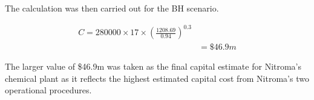 The calculation was then carried out for the BH scenario.

\begin{equation}
\begin{split} 
C=280000 \times 17 \times \left(\frac{1208.69}{0.94}\right)^{0.3}  \\
 & =\$46.9m 
\end{split}
\end{equation}

The larger value of \$46.9m was taken as the final capital estimate for Nitroma's chemical plant as it reflects the highest estimated capital cost from Nitroma's two operational procedures.